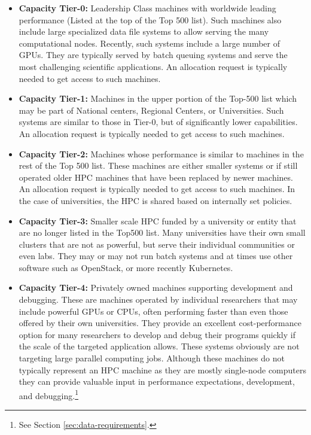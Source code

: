 \documentclass[utf8]{FrontiersinVancouver} %
\begin{document}
\begin{itemize}
\item {\bf Capacity Tier-0:} Leadership Class machines with worldwide leading
  performance (Listed at the top of the Top 500 list). Such machines also include large specialized data file systems to allow serving the many computational nodes. Recently, such systems include a large number of GPUs. They are typically served by batch queuing systems and serve the most challenging scientific applications. An allocation request is typically needed to get access to such machines.
\item {\bf Capacity Tier-1:} Machines in the upper portion of the Top-500 list which may be part of National centers, Regional Centers, or Universities. Such systems are similar to those in Tier-0, but of significantly lower capabilities.
An allocation request is typically needed to get access to such machines.
\item {\bf Capacity Tier-2:} Machines whose performance is similar to machines
  in the rest of the Top 500 list. These machines are either smaller systems or if still operated older HPC machines that have been replaced by newer machines.
  An allocation request is typically needed to get access to such machines. In the case of universities, the HPC is shared based on internally set policies.
\item {\bf Capacity Tier-3:} Smaller scale HPC funded by a university or entity
  that are no longer listed in the Top500 list. Many universities have their own small clusters that are not as powerful, but serve their individual communities or even labs. They may or may not run batch systems and at times use other software such as OpenStack, or more recently Kubernetes. 
\item {\bf Capacity Tier-4:} Privately owned machines supporting development
  and debugging. These are machines operated by individual researchers that may include powerful GPUs or CPUs, often performing faster than even those offered by their own universities. They provide an excellent cost-performance option for many researchers to develop and debug their programs quickly if the scale of the targeted application allows. These systems obviously are not targeting large parallel computing jobs. Although these machines do not typically represent an HPC machine as they are mostly single-node computers they can provide valuable input in performance expectations, development, and debugging.\footnote{See Section \ref{sec:data-requirements}.}
\end{itemize}
\end{document}
